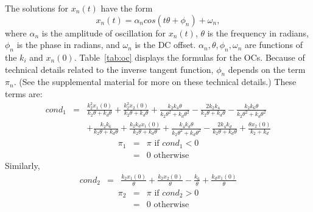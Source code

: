 \documentclass{bmcart}
\newcommand{\tab}[1]{Table~\ref{#1}}
\begin{document}
The solutions for $x_n(t)$ have the form
\begin{equation}
    x_n(t) = \alpha_n cos(t \theta  + \phi_n) + \omega_n,
\end{equation}
where $\alpha_n$ is the amplitude of oscillation for $x_n(t)$,
$\theta$ is the frequency in radians,
$\phi_n$ is the phase in radians, and
$\omega_n$ is the DC offset.
$\alpha_n, \theta, \phi_n, \omega_n$ are functions of the $k_i$ and $x_n (0)$.
\tab{tab:oc} displays the formulas for the OCs. Because of technical details related to the inverse tangent function, $\phi_n$ depends on the term $\pi_n$. (See the supplemental material for more on these technical details.)
These terms are:
\begin{eqnarray*}
cond_1 & = & 
\frac{k_{2}^{2} x_1 (0)}{k_{2} \theta + k_{d} \theta} + \frac{k_{2}^{2} x_2 (0)}{k_{2} \theta + k_{d} \theta} + \frac{k_{2} k_{4} \theta}{k_{2} \theta^{2} + k_{d} \theta^{2}} - \frac{2 k_{2} k_{4}}{k_{2} \theta + k_{d} \theta} 
- \frac{k_{2} k_{6} \theta}{k_{2} \theta^{2} + k_{d} \theta^{2}}  \\
& & 
+ \frac{k_{2} k_{6}}{k_{2} \theta + k_{d} \theta} + \frac{k_{2} k_{d} x_1 (0)}{k_{2} \theta + k_{d} \theta} + \frac{k_{4} k_{d} \theta}{k_{2} \theta^{2} + k_{d} \theta^{2}} - \frac{2 k_{4} k_{d}}{k_{2} \theta + k_{d} \theta} + \frac{\theta x_2 (0)}{k_{2} + k_{d}}
\end{eqnarray*}
\begin{eqnarray*}
\pi_1 & = & \pi \text{ if } cond_1 < 0 \\
& = & 0 \text { otherwise}
\end{eqnarray*}
Similarly,
\begin{eqnarray*}
cond_2 &  = &  \frac{k_{2} x_1 (0)}{\theta} + \frac{k_{2} x_2 (0)}{\theta} - \frac{k_{6}}{\theta} + \frac{k_{d} x_1 (0)}{\theta}
\end{eqnarray*}
\begin{eqnarray*}
\pi_2 & = & \pi \text{ if } cond_2 > 0 \\
& = & 0 \text { otherwise}
\end{eqnarray*}
\end{document}
